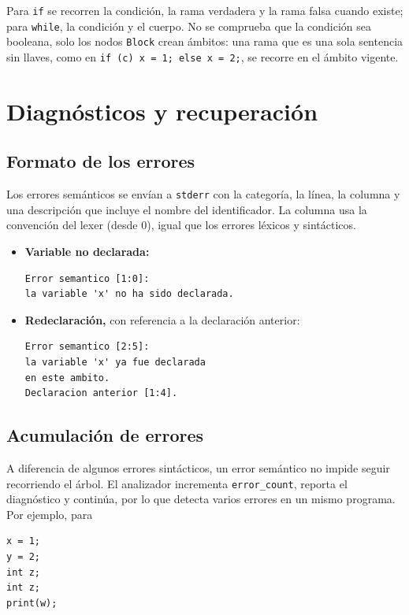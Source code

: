 \documentclass[12pt,letterpaper]{article}
\begin{document}
Para \texttt{if} se recorren la condición, la rama verdadera y la rama falsa cuando existe; para
\texttt{while}, la condición y el cuerpo. No se comprueba que la condición sea booleana, solo los nodos
\texttt{Block} crean ámbitos: una rama que es una sola sentencia sin llaves, como en
\texttt{if (c) x = 1; else x = 2;}, se recorre en el ámbito vigente.

\section*{Diagnósticos y recuperación}

\subsection*{Formato de los errores}

Los errores semánticos se envían a \texttt{stderr} con la categoría, la línea, la columna y una descripción que
incluye el nombre del identificador. La columna usa la convención del lexer (desde 0), igual que los errores
léxicos y sintácticos.

\begin{itemize}
\item \textbf{Variable no declarada:}
\begin{verbatim}
Error semantico [1:0]:
la variable 'x' no ha sido declarada.
\end{verbatim}
\item \textbf{Redeclaración,} con referencia a la declaración anterior:
\begin{verbatim}
Error semantico [2:5]:
la variable 'x' ya fue declarada
en este ambito.
Declaracion anterior [1:4].
\end{verbatim}
\end{itemize}

\subsection*{Acumulación de errores}

A diferencia de algunos errores sintácticos, un error semántico no impide seguir recorriendo el árbol. El
analizador incrementa \texttt{error\_count}, reporta el diagnóstico y continúa, por lo que detecta varios
errores en un mismo programa. Por ejemplo, para

\begin{verbatim}
x = 1;
y = 2;
int z;
int z;
print(w);
\end{verbatim}
\end{document}
